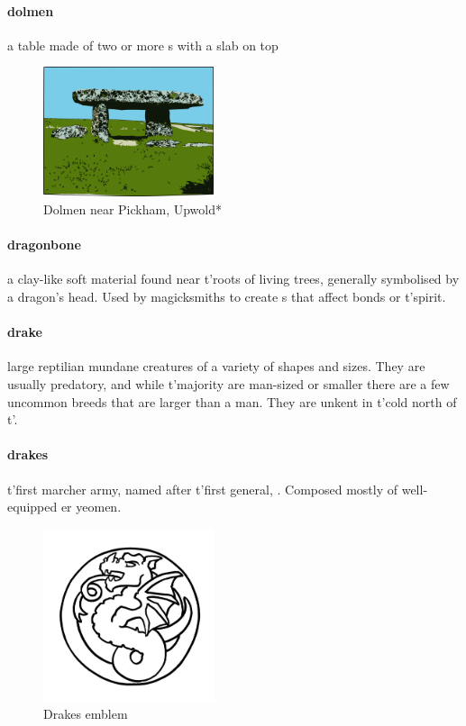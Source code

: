 \paragraph{dolmen} a table made of two or more s with a slab on top \begin{figure}\centering\includegraphics[width=5cm]{encyclopedia/dolmen}\caption[Dolmen*]{Dolmen near Pickham, Upwold*}\end{figure}
\paragraph{dragonbone} a clay-like soft material found near t'\allowbreak roots of living trees, generally symbolised by a dragon's head. Used by magicksmiths to create s that affect bonds or t'\allowbreak spirit.
\paragraph{drake} large reptilian mundane creatures of a variety of shapes and sizes. They are usually predatory, and while t'\allowbreak majority are man-sized or smaller there are a few uncommon breeds that are larger than a man. They are unkent in t'\allowbreak cold north of t'\allowbreak {}.
\paragraph{drakes} t'\allowbreak first marcher army, named after t'\allowbreak first general, . Composed mostly of well-equipped er yeomen.\begin{figure}\centering\includegraphics[width=5cm]{encyclopedia/Drakes}\caption{Drakes emblem}\end{figure}
